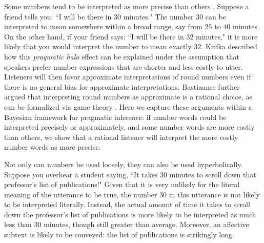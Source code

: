 \documentclass{article} %
\begin{document}
Some numbers tend to be interpreted as more precise than others \cite{lasersohn1999pragmatic}. Suppose a friend tells you: ``I will be there in $30$ minutes." The number $30$ can be interpreted to mean somewhere within a broad range, say from $25$ to $40$ minutes. On the other hand, if your friend says: ``I will be there in $32$ minutes," it is more likely that you would interpret the number to mean exactly $32$. 
Krifka \cite{krifka2007approximate} described how this \emph{pragmatic halo} effect can be explained under the assumption that speakers prefer number expressions that are shorter and less costly to utter. Listeners will then favor approximate interpretations of round numbers even if there is no general bias for approximate interpretations. Bastiaanse \cite{bastiaanse2011rationality} further argued that interpreting round numbers as approximate is a rational choice, as can be formalized via game theory \cite{jaeger}. 
Here we capture these arguments within a Bayesian framework for pragmatic inference: if number words could be interpreted precisely or approximately, and some number words are more costly than others, we show that a rational listener will interpret the more costly number words as more precise.

Not only can numbers be used loosely, they can also be used hyperbolically. Suppose you overhear a student saying, ``It takes 30 minutes to scroll down that professor's list of publications!" Given that it is very unlikely for the literal meaning of the utterance to be true, the number $30$ in this utterance is not likely to be interpreted literally. Instead, the actual amount of time it takes to scroll down the professor's list of publications is more likely to be interpreted as much less than 30 minutes, though still greater than average. Moreover, an affective subtext is likely to be conveyed: the list of publications is strikingly long.
\end{document}
